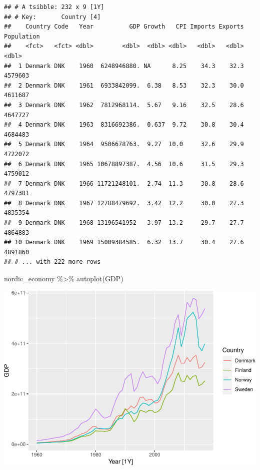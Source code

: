 \documentclass[
]{book}
\newenvironment{Shaded}{\begin{snugshade}}{\end{snugshade}}
\newcommand{\FunctionTok}[1]{\textcolor[rgb]{0.00,0.00,0.00}{#1}}
\newcommand{\NormalTok}[1]{#1}
\newcommand{\SpecialCharTok}[1]{\textcolor[rgb]{0.00,0.00,0.00}{#1}}
\begin{document}
\begin{verbatim}
## # A tsibble: 232 x 9 [1Y]
## # Key:       Country [4]
##    Country Code   Year          GDP Growth   CPI Imports Exports Population
##    <fct>   <fct> <dbl>        <dbl>  <dbl> <dbl>   <dbl>   <dbl>      <dbl>
##  1 Denmark DNK    1960  6248946880. NA      8.25    34.3    32.3    4579603
##  2 Denmark DNK    1961  6933842099.  6.38   8.53    32.3    30.0    4611687
##  3 Denmark DNK    1962  7812968114.  5.67   9.16    32.5    28.6    4647727
##  4 Denmark DNK    1963  8316692386.  0.637  9.72    30.8    30.4    4684483
##  5 Denmark DNK    1964  9506678763.  9.27  10.0     32.6    29.9    4722072
##  6 Denmark DNK    1965 10678897387.  4.56  10.6     31.5    29.3    4759012
##  7 Denmark DNK    1966 11721248101.  2.74  11.3     30.8    28.6    4797381
##  8 Denmark DNK    1967 12788479692.  3.42  12.2     30.0    27.3    4835354
##  9 Denmark DNK    1968 13196541952   3.97  13.2     29.7    27.7    4864883
## 10 Denmark DNK    1969 15009384585.  6.32  13.7     30.4    27.6    4891860
## # ... with 222 more rows
\end{verbatim}

\begin{Shaded}
\begin{Highlighting}[]
\NormalTok{nordic\_economy }\SpecialCharTok{\%\textgreater{}\%} \FunctionTok{autoplot}\NormalTok{(GDP)}
\end{Highlighting}
\end{Shaded}

\includegraphics{graphics/unnamed-chunk-71-1.pdf}
\end{document}
